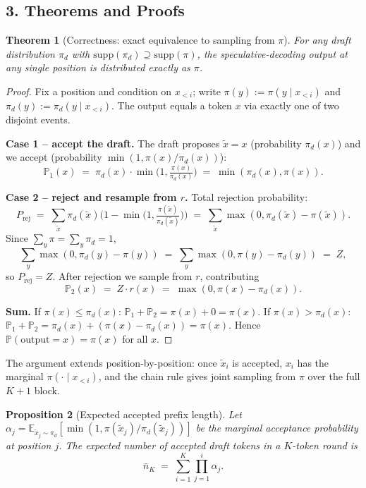 \documentclass[11pt]{article}
\newtheorem{theorem}{Theorem}[section]
\newtheorem{proposition}[theorem]{Proposition}
\theoremstyle{remark}
\begin{document}
\subsection*{3. Theorems and Proofs}

\begin{theorem}[Correctness: exact equivalence to sampling from $\pi$]\label{thm:correctness}
For any draft distribution $\pi_d$ with $\mathrm{supp}(\pi_d) \supseteq \mathrm{supp}(\pi)$, the speculative-decoding output at any single position is distributed exactly as $\pi$.
\end{theorem}

\begin{proof}
Fix a position and condition on $x_{<i}$; write $\pi(y) := \pi(y \mid x_{<i})$ and $\pi_d(y) := \pi_d(y \mid x_{<i})$. The output equals a token $x$ via exactly one of two disjoint events.

\textbf{Case 1 -- accept the draft.} The draft proposes $\tilde x = x$ (probability $\pi_d(x)$) and we accept (probability $\min(1, \pi(x)/\pi_d(x))$):
\[
\mathbb{P}_1(x) \;=\; \pi_d(x) \cdot \min\!\Big(1, \tfrac{\pi(x)}{\pi_d(x)}\Big) \;=\; \min(\pi_d(x), \pi(x)).
\]

\textbf{Case 2 -- reject and resample from $r$.} Total rejection probability:
\[
P_{\text{rej}} \;=\; \sum_{\tilde x} \pi_d(\tilde x)\Big(1 - \min\!\big(1, \tfrac{\pi(\tilde x)}{\pi_d(\tilde x)}\big)\Big) \;=\; \sum_{\tilde x} \max(0, \pi_d(\tilde x) - \pi(\tilde x)).
\]
Since $\sum_y \pi = \sum_y \pi_d = 1$,
\[
\sum_y \max(0, \pi_d(y) - \pi(y)) \;=\; \sum_y \max(0, \pi(y) - \pi_d(y)) \;=\; Z,
\]
so $P_{\text{rej}} = Z$. After rejection we sample from $r$, contributing
\[
\mathbb{P}_2(x) \;=\; Z \cdot r(x) \;=\; \max(0, \pi(x) - \pi_d(x)).
\]

\textbf{Sum.} If $\pi(x) \le \pi_d(x)$: $\mathbb{P}_1 + \mathbb{P}_2 = \pi(x) + 0 = \pi(x)$. If $\pi(x) > \pi_d(x)$: $\mathbb{P}_1 + \mathbb{P}_2 = \pi_d(x) + (\pi(x) - \pi_d(x)) = \pi(x)$. Hence $\mathbb{P}(\text{output}=x) = \pi(x)$ for all $x$. \qedhere
\end{proof}

The argument extends position-by-position: once $\tilde x_i$ is accepted, $x_i$ has the marginal $\pi(\cdot \mid x_{<i})$, and the chain rule gives joint sampling from $\pi$ over the full $K{+}1$ block.

\begin{proposition}[Expected accepted prefix length]\label{prop:expected}
Let $\alpha_j = \mathbb{E}_{\tilde x_j \sim \pi_d}[\min(1, \pi(\tilde x_j)/\pi_d(\tilde x_j))]$ be the marginal acceptance probability at position $j$. The expected number of accepted draft tokens in a $K$-token round is
\[
\bar n_K \;=\; \sum_{i=1}^{K} \prod_{j=1}^{i} \alpha_j.
\]
\end{proposition}
\end{document}
